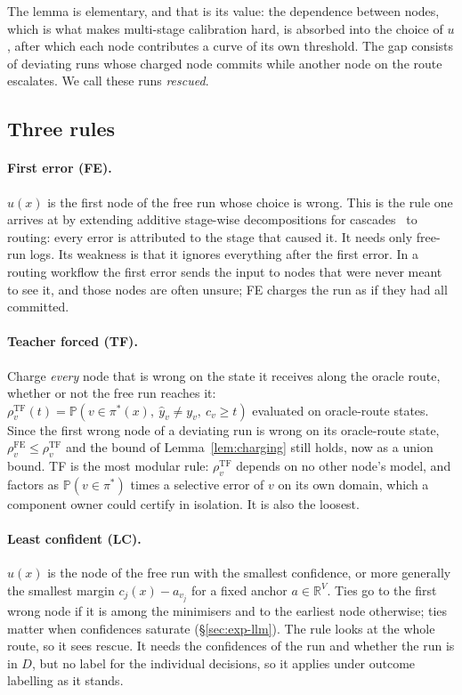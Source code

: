 \documentclass[11pt]{article}
\theoremstyle{definition}
\theoremstyle{remark}
\newcommand{\Prob}{\mathbb{P}}
\begin{document}
The lemma is elementary, and that is its value: the dependence between nodes, which is what
makes multi-stage calibration hard, is absorbed into the choice of $u$, after which each node
contributes a curve of its own threshold. The gap consists of deviating runs whose charged
node commits while another node on the route escalates. We call these runs \emph{rescued}.

\subsection{Three rules}\label{sec:rules}

\paragraph{First error (FE).} $u(x)$ is the first node of the free run whose choice is wrong.
This is the rule one arrives at by extending additive stage-wise decompositions for
cascades~\citep{sun2026compcrc} to routing: every error is attributed to the stage that caused
it. It needs only free-run logs. Its weakness is that it ignores everything after the first
error. In a routing workflow the first error sends the input to nodes that were never meant to
see it, and those nodes are often unsure; FE charges the run as if they had all committed.

\paragraph{Teacher forced (TF).} Charge \emph{every} node that is wrong on the state it
receives along the oracle route, whether or not the free run reaches it:
$\rho^{\mathrm{TF}}_v(t)=\Prob(v\in\pi^*(x),\ \hat y_v\ne y_v,\ c_v\ge t)$ evaluated on
oracle-route states. Since the first wrong node of a deviating run is wrong on its oracle-route
state, $\rho^{\mathrm{FE}}_v\le\rho^{\mathrm{TF}}_v$ and the bound of Lemma~\ref{lem:charging}
still holds, now as a union bound. TF is the most modular rule: $\rho^{\mathrm{TF}}_v$ depends
on no other node's model, and factors as $\Prob(v\in\pi^*)$ times a selective error of $v$ on
its own domain, which a component owner could certify in isolation. It is also the loosest.

\paragraph{Least confident (LC).} $u(x)$ is the node of the free run with the smallest
confidence, or more generally the smallest margin $c_j(x)-a_{v_j}$ for a fixed anchor
$a\in\mathbb{R}^V$. Ties go to the first wrong node if it is among the minimisers and to the
earliest node otherwise; ties matter when confidences saturate (\S\ref{sec:exp-llm}). The rule
looks at the whole route, so it sees rescue. It needs the confidences of the run and whether
the run is in $D$, but no label for the individual decisions, so it applies under outcome
labelling as it stands.
\end{document}
